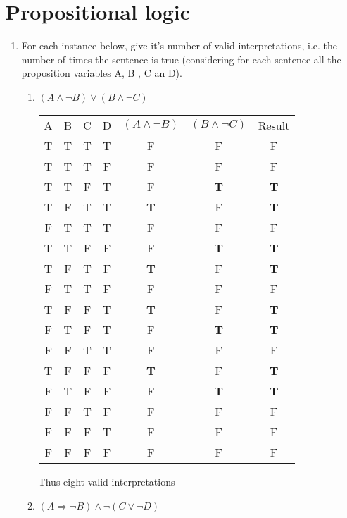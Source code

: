 \section{Propositional logic}
\begin{enumerate}
    \item For each instance below, give it's number of valid interpretations,
    i.e. the number of times the sentence is true (considering for each
    sentence all the proposition variables A, B , C an D).
    	\begin{enumerate}
    		\item $(A \wedge \lnot B) \vee (B \wedge \lnot C)$
    			\begin{framed}
    				\begin{tabular}{c|c|c|c|c|c|c}
    					A	&B	&C	&D	&$(A \wedge \lnot B)$	&$(B \wedge \lnot C)$ &Result\\
    					T	&T	&T	&T	&F			&F			&F\\
    					T	&T	&T	&F	&F			&F			&F\\
    					T	&T	&F	&T	&F			&\textbf{T}	&\textbf{T}\\
    					T	&F	&T	&T	&\textbf{T}	&F			&\textbf{T}\\
    					F	&T	&T	&T	&F			&F			&F\\
    					T	&T	&F	&F	&F			&\textbf{T}	&\textbf{T}\\
    					T	&F	&T	&F	&\textbf{T}	&F			&\textbf{T}\\
    					F	&T	&T	&F	&F			&F			&F\\
    					T	&F	&F	&T	&\textbf{T}	&F			&\textbf{T}\\
    					F	&T	&F	&T	&F			&\textbf{T}	&\textbf{T}\\
    					F	&F	&T	&T	&F			&F			&F\\
    					T	&F	&F	&F	&\textbf{T}	&F			&\textbf{T}\\
    					F	&T	&F	&F	&F			&\textbf{T}	&\textbf{T}\\
    					F	&F	&T	&F	&F			&F			&F\\
    					F	&F	&F	&T	&F			&F			&F\\
    					F	&F	&F	&F	&F			&F			&F\\
    				\end{tabular}
    				\FloatBarrier
    				\vspace{5mm}
    				Thus eight valid interpretations
    			\end{framed}
    		\item $(A \Rightarrow \lnot B) \wedge \lnot(C \vee \lnot D)$
    			\begin{framed}

\end{framed}
\end{enumerate}
\end{enumerate}

